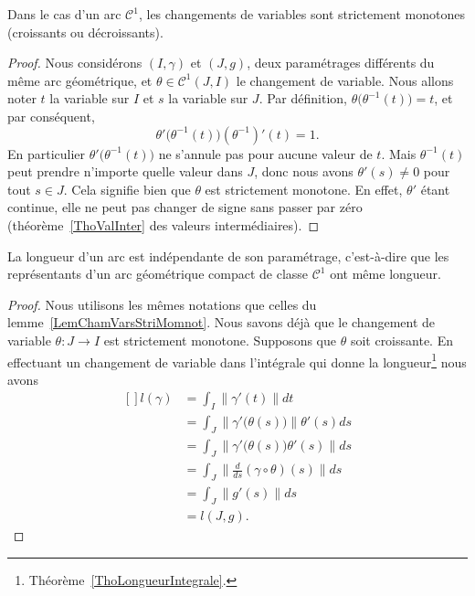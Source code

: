 
\begin{lemma}       \label{LemChamVarsStriMomnot}
	Dans le cas d'un arc \( \mathcal{C}^1\), les changements de variables sont strictement monotones (croissants ou décroissants).
\end{lemma}

\begin{proof}
	Nous considérons \( (I,\gamma)\) et \( (J,g)\), deux paramétrages différents du même arc géométrique, et \( \theta\in \mathcal{C}^1(J,I)\) le changement de variable. Nous allons noter \( t\) la variable sur \( I\) et \( s\) la variable sur \( J\). Par définition, \( \theta\big( \theta^{-1}(t) \big)=t\), et par conséquent,
	\begin{equation}
		\theta'\big( \theta^{-1}(t) \big)(\theta^{-1})'(t)=1.
	\end{equation}
	En particulier \( \theta'\big( \theta^{-1}(t) \big)\) ne s'annule pas pour aucune valeur de \( t\). Mais \( \theta^{-1}(t)\) peut prendre n'importe quelle valeur dans \( J\), donc nous avons \( \theta'(s)\neq 0\) pour tout \( s\in J\). Cela signifie bien que \( \theta\) est strictement monotone. En effet, \( \theta'\) étant continue, elle ne peut pas changer de signe sans passer par zéro (théorème~\ref{ThoValInter} des valeurs intermédiaires).
\end{proof}

\begin{theorem}     \label{ThoLongArcGeom}
	La longueur d'un arc est indépendante de son paramétrage, c'est-à-dire que les représentants d'un arc géométrique compact de classe \( \mathcal{C}^1\) ont même longueur.
\end{theorem}

\begin{proof}
	Nous utilisons les mêmes notations que celles du lemme~\ref{LemChamVarsStriMomnot}. Nous savons déjà que le changement de variable \( \theta \colon J\to I\) est strictement monotone. Supposons que \( \theta\) soit croissante.
	En effectuant un changement de variable dans l'intégrale qui donne la longueur\footnote{Théorème~\ref{ThoLongueurIntegrale}.} nous avons
	\begin{equation}
		\begin{aligned}[]
			l(\gamma) & =\int_I\| \gamma'(t) \|dt                             \\
			          & =\int_J\| \gamma'\big( \theta(s) \big) \|\theta'(s)ds \\
			          & =\int_J\| \gamma'\big( \theta(s) \big)\theta'(s) \|ds \\
			          & =\int_J\| \frac{ d }{ ds }(\gamma\circ\theta)(s) \|ds \\
			          & =\int_J\| g'(s) \|ds                                  \\
			          & =l(J,g).
		\end{aligned}
	\end{equation}
\end{proof}

